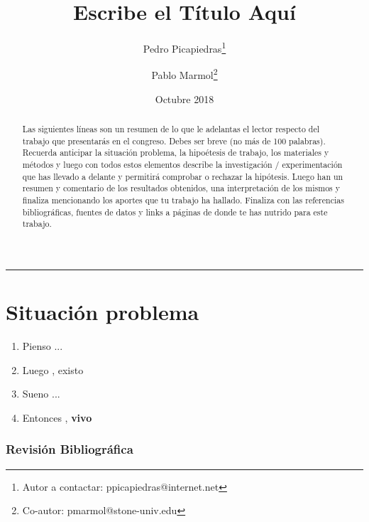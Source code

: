 \documentclass[11pt,a4paper]{article}
\begin{document}
\pagestyle{firststyle}






\title{Escribe el Título Aquí} 
\date{Octubre 2018}
\author[1]{Pedro Picapiedras\thanks{Autor a contactar: ppicapiedras@internet.net}}
\author[2]{Pablo Marmol\thanks{Co-autor: pmarmol@stone-univ.edu}}



\maketitle


\begin{abstract}
Las siguientes líneas son un resumen de lo que le adelantas el lector respecto del trabajo que presentarás en el congreso. Debes ser breve (no más de 100 palabras). Recuerda anticipar la situación problema, la hipoétesis de trabajo, los materiales y métodos y luego con todos estos elementos describe la investigación / experimentación que has llevado a delante y permitirá comprobar o rechazar la hipótesis. Luego han un resumen y comentario de los resultados obtenidos, una interpretación de los mismos y finaliza mencionando los aportes que tu trabajo ha hallado. Finaliza con las referencias bibliográficas, fuentes de datos y links a páginas de donde te has nutrido para este trabajo.
\end{abstract} \hspace{10pt}


\hrule


\section*{Situación problema}
\pagestyle{empty}


\begin{enumerate}
\item Pienso ...
\item Luego , existo
\item Sueno ...
\item Entonces ,\textbf{ vivo}
\end{enumerate}


\subsubsection*{Revisión Bibliográfica}
\thispagestyle{fancy}
\end{document}
